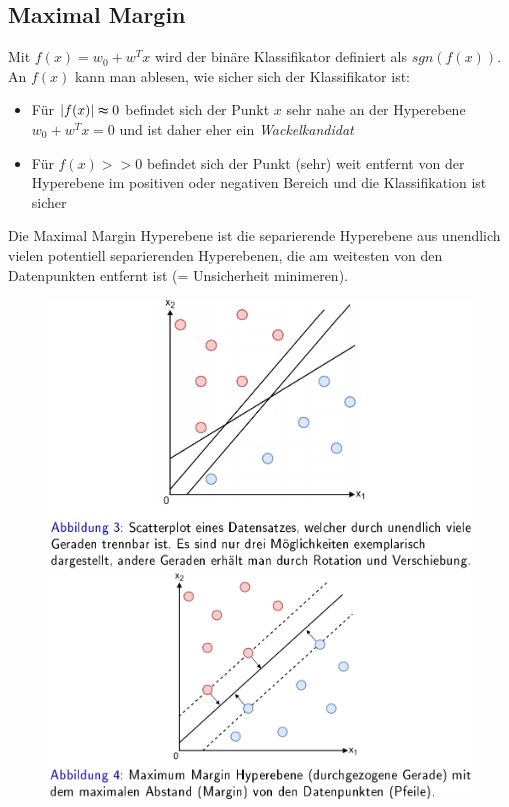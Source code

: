 \documentclass{report}
\begin{document}
\subsection{Maximal Margin}
Mit $f(x) = w_0 + w^Tx$ wird der binäre Klassifikator definiert als $sgn(f(x))$.\\
An $f(x)$ kann man ablesen, wie sicher sich der Klassifikator ist:\\
\vspace*{-1.5em}
\begin{itemize}
  \item Für $|f(x)| \thickapprox 0$ befindet sich der Punkt $x$ sehr nahe an der Hyperebene
  $w_0 + w^Tx = 0$ und ist daher eher ein \textit{Wackelkandidat}
  \item Für $f(x) >> 0$ befindet sich der Punkt (sehr) weit entfernt von der Hyperebene
  im positiven oder negativen Bereich und die Klassifikation ist sicher
\end{itemize}

Die Maximal Margin Hyperebene ist die separierende Hyperebene aus unendlich vielen potentiell separierenden
Hyperebenen, die am weitesten von den Datenpunkten entfernt ist (= Unsicherheit minimeren).

\begin{figure}[H]
  \centering
  \begin{minipage}[b]{0.4\textwidth}
    \includegraphics[scale=.265]{ml06_3}
  \end{minipage}
  \hfill
  \begin{minipage}[b]{0.4\textwidth}
    \includegraphics[scale=.275]{ml06_4}
  \end{minipage}
\end{figure}
\end{document}
